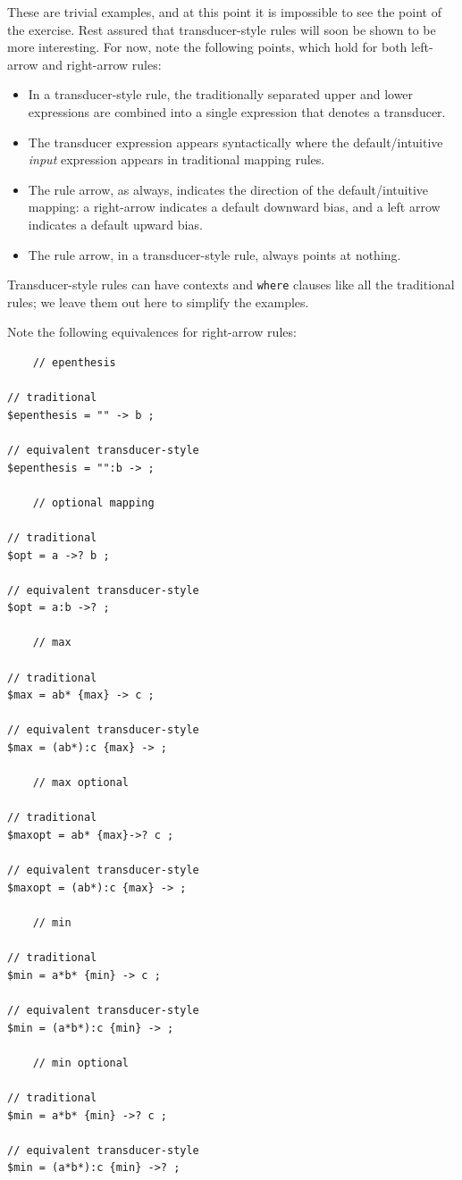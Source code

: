 These are trivial examples, and at this point it is impossible to see the point of the exercise.  Rest
assured that transducer-style rules will soon be shown to be more interesting.  For now, note the
following points, which hold for both left-arrow and right-arrow rules:

\begin{itemize}
	\item
In a transducer-style rule, the traditionally separated upper and lower expressions are combined into a single expression
that denotes a transducer.
\item
	The transducer expression appears syntactically where the default/intuitive \emph{input} expression appears in
	traditional mapping rules.
\item
	The rule arrow, as always, indicates the direction of the default/intuitive mapping:  a right-arrow
	indicates a default downward bias, and a left arrow indicates a default upward
	bias.
\item
The rule arrow, in a transducer-style rule, always points at nothing.
\end{itemize}

\noindent
Transducer-style rules can have contexts and \texttt{where} clauses like all the traditional rules; we
leave them out here to simplify the examples.

Note the following equivalences for right-arrow rules:

\begin{Verbatim}
	// epenthesis

// traditional
$epenthesis = "" -> b ;

// equivalent transducer-style
$epenthesis = "":b -> ;

	// optional mapping

// traditional
$opt = a ->? b ;

// equivalent transducer-style
$opt = a:b ->? ;

	// max 

// traditional
$max = ab* {max} -> c ;

// equivalent transducer-style
$max = (ab*):c {max} -> ;

	// max optional

// traditional
$maxopt = ab* {max}->? c ;

// equivalent transducer-style
$maxopt = (ab*):c {max} -> ;

	// min

// traditional
$min = a*b* {min} -> c ;

// equivalent transducer-style
$min = (a*b*):c {min} -> ;

	// min optional

// traditional
$min = a*b* {min} ->? c ;

// equivalent transducer-style
$min = (a*b*):c {min} ->? ;
\end{Verbatim}

